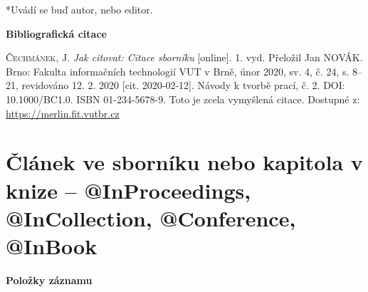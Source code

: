 *Uvádí se buď autor, nebo editor.

\bigskip

\noindent \textbf{Bibliografická citace}

\medskip

\noindent \textsc{Čechmánek}, J. \textit{Jak citovat: Citace sborníku} [online]. 1. vyd. Přeložil Jan NOVÁK.
Brno: Fakulta informačních technologií VUT v Brně, únor 2020, sv. 4, č. 24, s. 8–21, revidováno 12. 2. 2020 [cit. 2020-02-12]. Návody k tvorbě prací, č. 2. DOI: 10.1000/BC1.0. ISBN 01-234-5678-9. Toto je zcela vymyšlená citace. Dostupné z: \url{https://merlin.fit.vutbr.cz}
\newpage
\section*{Článek ve sborníku nebo kapitola v knize -- @InProceedings, @InCollection, @Conference, @InBook}
\label{pr-kapitola}
\noindent \textbf{Položky záznamu}

\medskip

